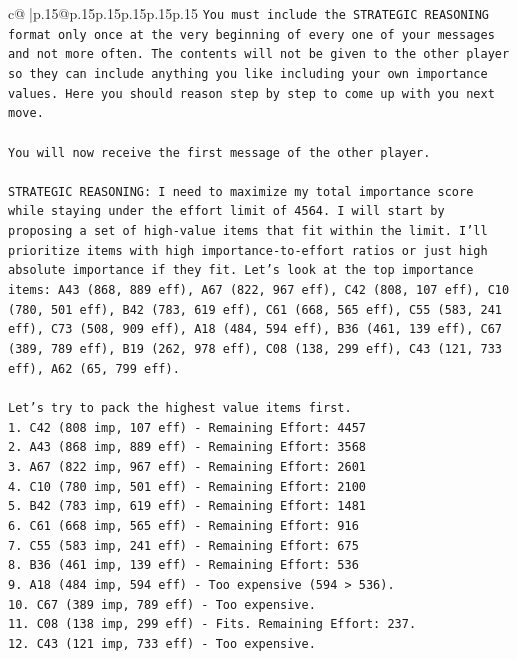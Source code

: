 \documentclass{article}
\begin{document}
{\begin{supertabular}{c@{$\;$}|p{.15\linewidth}@{}p{.15\linewidth}p{.15\linewidth}p{.15\linewidth}p{.15\linewidth}p{.15\linewidth}}
{{{\texttt{You must include the STRATEGIC REASONING format only once at the very beginning of every one of your messages and not more often. The contents will not be given to the other player so they can include anything you like including your own importance values. Here you should reason step by step to come up with you next move.} \\
\\ 
\texttt{You will now receive the first message of the other player.} \\
\\ 
\texttt{STRATEGIC REASONING: I need to maximize my total importance score while staying under the effort limit of 4564. I will start by proposing a set of high{-}value items that fit within the limit. I'll prioritize items with high importance{-}to{-}effort ratios or just high absolute importance if they fit. Let's look at the top importance items: A43 (868, 889 eff), A67 (822, 967 eff), C42 (808, 107 eff), C10 (780, 501 eff), B42 (783, 619 eff), C61 (668, 565 eff), C55 (583, 241 eff), C73 (508, 909 eff), A18 (484, 594 eff), B36 (461, 139 eff), C67 (389, 789 eff), B19 (262, 978 eff), C08 (138, 299 eff), C43 (121, 733 eff), A62 (65, 799 eff).} \\
\\ 
\texttt{Let's try to pack the highest value items first.} \\
\texttt{1. C42 (808 imp, 107 eff) {-} Remaining Effort: 4457} \\
\texttt{2. A43 (868 imp, 889 eff) {-} Remaining Effort: 3568} \\
\texttt{3. A67 (822 imp, 967 eff) {-} Remaining Effort: 2601} \\
\texttt{4. C10 (780 imp, 501 eff) {-} Remaining Effort: 2100} \\
\texttt{5. B42 (783 imp, 619 eff) {-} Remaining Effort: 1481} \\
\texttt{6. C61 (668 imp, 565 eff) {-} Remaining Effort: 916} \\
\texttt{7. C55 (583 imp, 241 eff) {-} Remaining Effort: 675} \\
\texttt{8. B36 (461 imp, 139 eff) {-} Remaining Effort: 536} \\
\texttt{9. A18 (484 imp, 594 eff) {-} Too expensive (594 > 536).} \\
\texttt{10. C67 (389 imp, 789 eff) {-} Too expensive.} \\
\texttt{11. C08 (138 imp, 299 eff) {-} Fits. Remaining Effort: 237.} \\
\texttt{12. C43 (121 imp, 733 eff) {-} Too expensive.} \\
}}}
\end{supertabular}}
\end{document}
